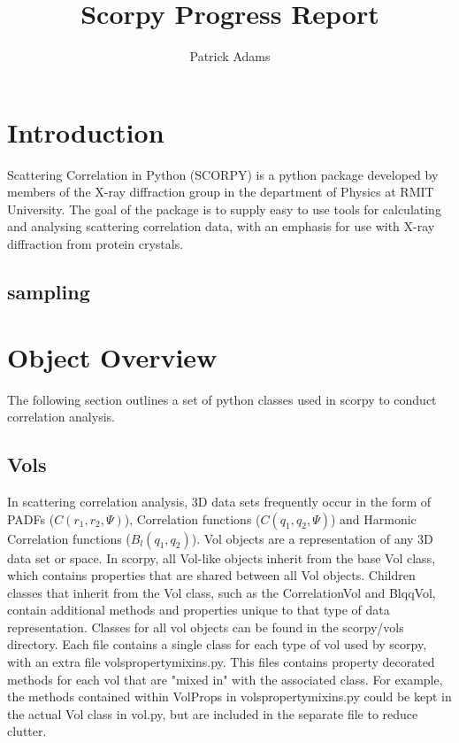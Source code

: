 \documentclass[a4, 12pt]{article}
\title{Scorpy Progress Report}
\author{Patrick Adams}
\date{}
\begin{document}
\maketitle


\section{Introduction}


Scattering Correlation in Python (SCORPY) is a python package developed by members of the X-ray diffraction group in the department of Physics at RMIT University. The goal of the package is to supply easy to use tools for calculating and analysing scattering correlation data, with an emphasis for use with X-ray diffraction from protein crystals.


\subsection{sampling}



\section{Object Overview}

The following section outlines a set of python classes used in scorpy to conduct correlation analysis.

\subsection{Vols}
In scattering correlation analysis, 3D data sets frequently occur in the form of PADFs ($C(r_1, r_2, \Psi)$), Correlation functions ($C(q_1, q_2, \Psi)$) and Harmonic Correlation functions ($B_l(q_1, q_2)$). Vol objects are a representation of any 3D data set or space. In scorpy, all Vol-like objects inherit from the base Vol class, which contains properties that are shared between all Vol objects. Children classes that inherit from the Vol class, such as the CorrelationVol and BlqqVol, contain additional methods and properties unique to that type of data representation. Classes for all vol objects can be found in the scorpy/vols directory. Each file contains a single class for each type of vol used by scorpy, with an extra file volspropertymixins.py. This files contains property decorated methods for each vol that are "mixed in" with the associated class. For example, the methods contained within VolProps in volspropertymixins.py could be kept in the actual Vol class in vol.py, but are included in the separate file to reduce clutter.
\end{document}
